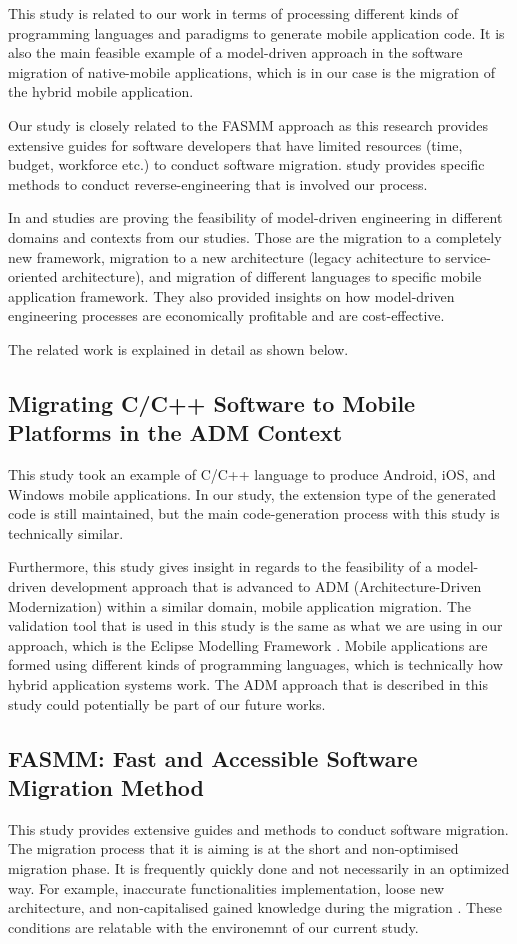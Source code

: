 \documentclass[conference]{IEEEtran}
\begin{document}
This \cite{b2} study is related to our work in terms of processing different kinds of 
programming languages and paradigms to generate mobile application code. It is also 
the main feasible example of a model-driven approach in the software migration of native-mobile applications,
which is in our case is the migration of the hybrid mobile application.

Our study is closely related to the FASMM approach \cite{b3} as this research
provides extensive guides for software developers that have limited 
resources (time, budget, workforce etc.) to conduct software migration. 
\cite{b4} study provides specific methods to conduct reverse-engineering 
that is involved our process.

In \cite{b5} and \cite{b6} studies are proving the feasibility of model-driven engineering
in different domains and contexts from our studies. Those are the migration to a completely new framework, 
migration to a new architecture (legacy achitecture to service-oriented architecture), and migration
of different languages to specific mobile application framework. 
They also provided insights on how model-driven engineering processes are economically
profitable and are cost-effective. 

The related work is explained in detail as shown below. 

\subsection{ Migrating C/C++ Software to Mobile Platforms in the ADM Context }
This study took an example of C/C++ language to produce Android, iOS, and Windows mobile applications. 
In our study, the extension type of the generated code is still maintained, but the main code-generation process with this study 
is technically similar. 

Furthermore, this study gives insight in regards to the feasibility of a model-driven development approach that is 
advanced to ADM (Architecture-Driven Modernization) within a similar domain, mobile application migration. 
The validation tool that is used in this study is the same as what we are using in our approach, which is the Eclipse Modelling Framework \cite{b2}.
Mobile applications are formed using different kinds of programming languages, which is technically 
how hybrid application systems work.
The ADM approach that is described in this study could potentially be part of our future works. 

\subsection{ FASMM: Fast and Accessible Software Migration Method }
This study provides extensive guides and methods to conduct software migration. The migration
process that it is aiming is at the short and non-optimised migration phase.
It is frequently quickly done and not necessarily in an optimized way. For example,
inaccurate functionalities implementation, loose new architecture, and non-capitalised gained knowledge
during the migration \cite{b3}. These conditions are relatable with the environemnt of our current study.
\end{document}
